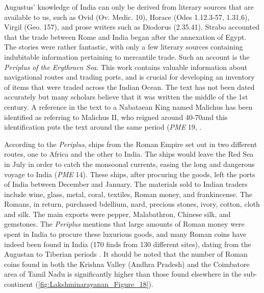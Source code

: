Augustus’ knowledge of India can only be derived from literary sources that are available to us, such as Ovid (Ov. Medic. 10), Horace (Odes 1.12.3-57, 1.31.6), Virgil (Geo. 157), and prose writers such as Diodorus (2.35.41). Strabo accounted that the trade between Rome and India began after the annexation of Egypt. The stories were rather fantastic, with only a few literary sources containing indubitable information pertaining to mercantile trade. Such an account is the \emph{Periplus of the Erythraen Sea}. This work contains valuable information about navigational routes and trading ports, and is crucial for developing an inventory of items that were traded across the Indian Ocean. The text has not been dated accurately but many scholars believe that it was written the middle of the 1st century\AD \parencite[][98]{charlesworth1928}.%
A reference in the text to a Nabataean King named Malichus has been identified as referring to Malichus II, who reigned around 40-70\AD and this identification puts the text around the same period (\emph{PME} 19, \cite[][9-35]{dihle1965}.%

According to the \emph{Periplus}, ships from the Roman Empire set out in two different routes, one to Africa and the other to India. The ships would leave the Red Sea in July in order to catch the monsoonal currents, easing the long and dangerous voyage to India (\emph{PME} 14). These ships, after procuring the goods, left the ports of India between December and January. The materials sold to Indian traders include wine, glass, metal, coral, textiles, Roman money, and frankincense. The Romans, in return, purchased bdellium, nard, precious stones, ivory, cotton, cloth and silk. The main exports were pepper, Malabathron, Chinese silk, and gemstones. The \emph{Periplus} mentions that large amounts of Roman money were spent in India to procure these luxurious goods, and many Roman coins have indeed been found in India (170 finds from 130 different sites), dating from the Augustan to Tiberian periods \parencite{turner1989}. It should be noted that the number of Roman coins found in both the Krishna Valley (Andhra Pradesh) and the Coimbatore area of Tamil Nadu is significantly higher than those found elsewhere in the sub-continent (\cref{fig:Lakshminarayanan_Figure_18}).

